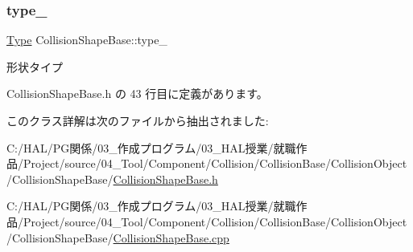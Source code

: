 \subsubsection{\texorpdfstring{type\+\_\+}{type\_}}
{\footnotesize\ttfamily \mbox{\hyperlink{class_collision_shape_base_a8abcef092855ad0ca191047044b002cb}{Type}} Collision\+Shape\+Base\+::type\+\_\+\hspace{0.3cm}{\ttfamily [private]}}



形状タイプ 



 Collision\+Shape\+Base.\+h の 43 行目に定義があります。



このクラス詳解は次のファイルから抽出されました\+:\begin{DoxyCompactItemize}
\item 
C\+:/\+H\+A\+L/\+P\+G関係/03\+\_\+作成プログラム/03\+\_\+\+H\+A\+L授業/就職作品/\+Project/source/04\+\_\+\+Tool/\+Component/\+Collision/\+Collision\+Base/\+Collision\+Object/\+Collision\+Shape\+Base/\mbox{\hyperlink{_collision_shape_base_8h}{Collision\+Shape\+Base.\+h}}\item 
C\+:/\+H\+A\+L/\+P\+G関係/03\+\_\+作成プログラム/03\+\_\+\+H\+A\+L授業/就職作品/\+Project/source/04\+\_\+\+Tool/\+Component/\+Collision/\+Collision\+Base/\+Collision\+Object/\+Collision\+Shape\+Base/\mbox{\hyperlink{_collision_shape_base_8cpp}{Collision\+Shape\+Base.\+cpp}}\end{DoxyCompactItemize}
